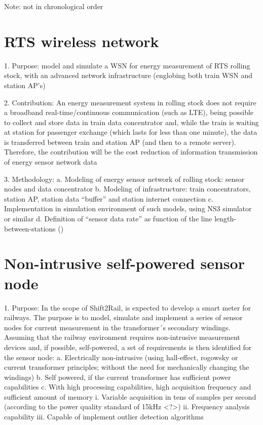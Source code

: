 \lipsum[4-4]

Note: not in chronological order

\section{RTS wireless network}





1.	Purpose: model and simulate a WSN for energy measurement of RTS rolling stock, with an advanced network infrastructure (englobing both train WSN and station AP’s)

2.	Contribution: An energy measurement system in rolling stock does not require a broadband real-time/continuous communication (such as LTE), being possible to collect and store data in train data concentrator and, while the train is waiting at station for passenger exchange (which lasts for less than one minute), the data is transferred between train and station AP (and then to a remote server). Therefore, the contribution will be the cost reduction of information transmission of energy sensor network data

3.	Methodology:
a.	Modeling of energy sensor network of rolling stock: sensor nodes and data concentrator
b.	Modeling of infrastructure: train concentrators, station AP, station data “buffer” and station internet connection
c.	Implementation in simulation environment of such models, using NS3 simulator or similar
d.	Definition of “sensor data rate” as function of the line length-between-stations ()


\section{Non-intrusive self-powered sensor node}

1.	Purpose: In the scope of Shift2Rail, is expected to develop a smart meter for railways. The purpose is to model, simulate and implement a series of sensor nodes for current measurement in the transformer´s secondary windings. Assuming that the railway environment requires non-intrusive measurement devices and, if possible, self-powered, a set of requirements is then identified for the sensor node:
a.	Electrically non-intrusive (using hall-effect, rogowsky or current transformer principles; without the need for mechanically changing the windings)
b.	Self powered, if the current transformer has sufficient power capabilities
c.	With high processing capabilities, high acquisition frequency and sufficient amount of memory 
i.	Variable acquisition in tens of samples per second (according to the power quality standard of 15kHz <?>)
ii.	Frequency analysis capability
iii.	Capable of implement outlier detection algorithms 

